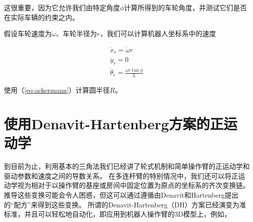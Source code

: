 这很重要，因为它允许我们由特定角度$\phi$计算所得到的车轮角度，并测试它们是否在实际车辆的约束之内。


假设车轮速度为$\dot{\omega}$、车轮半径为$r$，我们可以计算机器人坐标系中的速度

\begin{eqnarray}
\dot{x}_r=\dot{\omega}r\\
\dot{y}_r=0\\
\dot{\theta}_r=\frac{\dot{\omega}r\tan\phi}{L}
\end{eqnarray}

使用（\ref{eq:ackermann}）计算圆半径$R$。

\section{使用Denavit-Hartenberg方案的正运动学}


到目前为止，利用基本的三角法我们已经讲了轮式机制和简单操作臂的正运动学和驱动参数和速度之间的导数关系。 在多连杆臂的特别情况中，我们还可以将正运动学视为相对于以操作臂的基座或房间中固定位置为原点的坐标系的齐次变换链。 推导这些变换可能会令人困惑，但这可以通过遵循由Denavit和Hartenberg提出的“配方”来得到这些变换。 所谓的Denavit-Hartenberg（DH）方案已经演变为准标准，并且可以轻松地自动化，即应用到机器人操作臂的3D模型上，例如，


